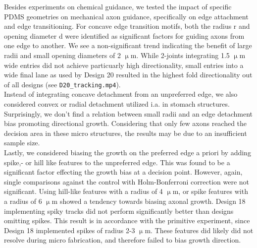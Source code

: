 Besides experiments on chemical guidance, we tested the impact of specific PDMS
geometries on mechanical axon guidance, specifically on edge attachment and edge
transitioning. For concave edge transition motifs, both the radius r and opening
diameter d were identified as significant factors for guiding axons from one
edge to another. We see a non-significant trend indicating the benefit of large
radii and small opening diameters of 2 $\upmu$m. While 2-joints integrating 1.5
$\upmu$m wide entries did not achieve particuarly high directionality, small
entries into a wide final lane as used by Design 20 resulted in the highest fold
directionality out of all designs (see \verb|D20_tracking.mp4|). \\
Instead of integrating concave detachment from an unpreferred edge, we also
considered convex or radial detachment utilized i.a. in stomach structures.
Surprisingly, we don't find a relation between small radii and an edge
detachment bias promoting directional growth. Considering that only few axons
reached the decision area in these micro structures, the results may be due to
an insufficient sample size. \\
Lastly, we considered biasing the growth on the preferred edge a priori by
adding spike,- or hill like features to the unpreferred edge. This was found to
be a significant factor effecting the growth bias at a decision point. However,
again, single comparisons against the control with Holm-Bonferroni correction
were not significant. Using hill-like features with a radius of 4 $\upmu$m, or
spike features with a radius of 6 $\upmu$m showed a tendency towards biasing
axonal growth. Design 18 implementing spiky tracks did not perform significantly
better than designs omitting spikes. This result is in accordance with the
primitive experiment, since Design 18 implemented spikes of radius 2-3 $\upmu$m.
These features did likely did not resolve during micro fabrication, and
therefore failed to bias growth direction.

